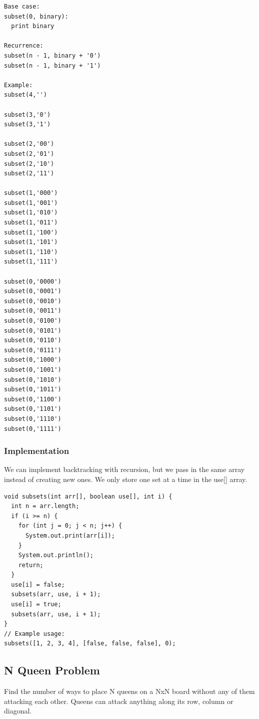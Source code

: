 \documentclass[11pt,oneside]{book}
\begin{document}
\begin{lstlisting}
Base case:
subset(0, binary):
  print binary
 
Recurrence:
subset(n - 1, binary + '0')
subset(n - 1, binary + '1')
 
Example:
subset(4,'')
 
subset(3,'0')
subset(3,'1')
 
subset(2,'00')
subset(2,'01')
subset(2,'10')
subset(2,'11')
 
subset(1,'000')
subset(1,'001')
subset(1,'010')
subset(1,'011')
subset(1,'100')
subset(1,'101')
subset(1,'110')
subset(1,'111')
 
subset(0,'0000')
subset(0,'0001')
subset(0,'0010')
subset(0,'0011')
subset(0,'0100')
subset(0,'0101')
subset(0,'0110')
subset(0,'0111')
subset(0,'1000')
subset(0,'1001')
subset(0,'1010')
subset(0,'1011')
subset(0,'1100')
subset(0,'1101')
subset(0,'1110')
subset(0,'1111')
\end{lstlisting}

\subsubsection{Implementation}

We can implement backtracking with recursion, but we pass in the same array instead of creating new ones. We only store one set at a time in the use[] array.

\begin{lstlisting}
void subsets(int arr[], boolean use[], int i) {
  int n = arr.length;
  if (i >= n) {
    for (int j = 0; j < n; j++) {
      System.out.print(arr[i]);
    }
    System.out.println();
    return;
  }
  use[i] = false;
  subsets(arr, use, i + 1);
  use[i] = true;
  subsets(arr, use, i + 1);
}
// Example usage:
subsets([1, 2, 3, 4], [false, false, false], 0);
\end{lstlisting}

\subsection{N Queen Problem}

Find the number of ways to place N queens on a NxN board without any of them attacking each other. Queens can attack anything along its row, column or diagonal.
\end{document}
